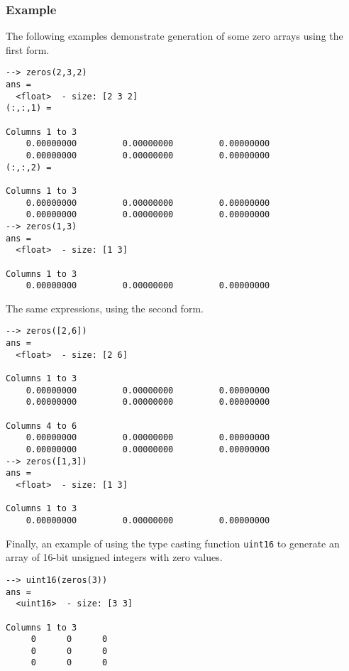 \subsubsection{Example}
The following examples demonstrate generation of some zero arrays 
using the first form.
\begin{verbatim}
--> zeros(2,3,2)
ans =
  <float>  - size: [2 3 2]
(:,:,1) =
  
Columns 1 to 3
    0.00000000         0.00000000         0.00000000
    0.00000000         0.00000000         0.00000000
(:,:,2) =
  
Columns 1 to 3
    0.00000000         0.00000000         0.00000000
    0.00000000         0.00000000         0.00000000
--> zeros(1,3)
ans =
  <float>  - size: [1 3]
  
Columns 1 to 3
    0.00000000         0.00000000         0.00000000
\end{verbatim}
The same expressions, using the second form.
\begin{verbatim}
--> zeros([2,6])
ans =
  <float>  - size: [2 6]
  
Columns 1 to 3
    0.00000000         0.00000000         0.00000000
    0.00000000         0.00000000         0.00000000
  
Columns 4 to 6
    0.00000000         0.00000000         0.00000000
    0.00000000         0.00000000         0.00000000
--> zeros([1,3])
ans =
  <float>  - size: [1 3]
  
Columns 1 to 3
    0.00000000         0.00000000         0.00000000
\end{verbatim}
Finally, an example of using the type casting function \verb|uint16| to generate an array of 16-bit unsigned integers with zero values.
\begin{verbatim}
--> uint16(zeros(3))
ans =
  <uint16>  - size: [3 3]
  
Columns 1 to 3
     0      0      0
     0      0      0
     0      0      0  
\end{verbatim}
